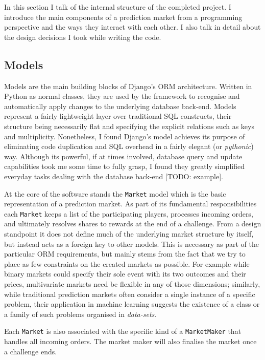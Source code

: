 \documentclass[bsc,frontabs,twoside,singlespacing,parskip,deptreport]{infthesis}     %
\begin{document}
In this section I talk of the internal structure of the completed project. I introduce the main components of a prediction market from a programming perspective and the ways they interact with each other. I also talk in detail about the design decisions I took while writing the code.

\subsection{Models}
    Models are the main building blocks of Django's ORM architecture. Written in Python as normal classes, they are used by the framework to recognise and automatically apply changes to the underlying database back-end. Models represent a fairly lightweight layer over traditional SQL constructs, their structure being necessarily flat and specifying the explicit relations such as keys and multiplicity. Nonetheless, I found Django’s model achieves its purpose of eliminating code duplication and SQL overhead in a fairly elegant (or {\em pythonic}) way. Although its powerful, if at times involved, database query and update capabilities took me some time to fully grasp, I found they greatly simplified everyday tasks dealing with the database back-end [TODO: example]. 
    
    At the core of the software stands the {\tt Market} model which is the basic representation of a prediction market. As part of its fundamental responsibilities each {\tt Market} keeps a list of the participating players, processes incoming orders, and ultimately resolves shares to rewards at the end of a challenge.    
    From a design standpoint it does not define much of the underlying market structure by itself, but instead acts as a foreign key to other models. This is necessary as part of the particular ORM requirements, but mainly stems from the fact that we try to place as few constraints on the created markets as possible. For example while binary markets could specify their sole event with its two outcomes and their prices, multivariate markets need be flexible in any of those dimensions; similarly, while traditional prediction markets often consider a single instance of a specific problem, their application in machine learning suggests the existence of a class or a family of such problems organised in {\em data-sets}. 
    



        Each {\tt Market} is also associated with the specific kind of a {\tt MarketMaker} that handles all incoming orders. The market maker will also finalise the market once a challenge ends.
    
\end{document}
